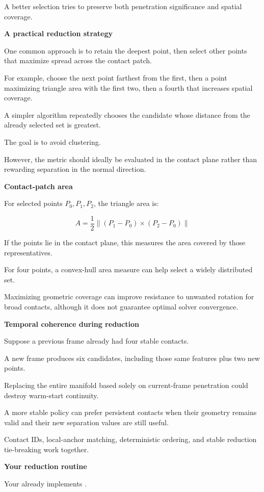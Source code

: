A better selection tries to preserve both penetration significance and spatial coverage.

\textbf{A practical reduction strategy}

One common approach is to retain the deepest point, then select other points that maximize spread across the contact patch.

For example, choose the next point farthest from the first, then a point maximizing triangle area with the first two, then a fourth that increases spatial coverage.

A simpler algorithm repeatedly chooses the candidate whose distance from the already selected set is greatest.

The goal is to avoid clustering.

However, the metric should ideally be evaluated in the contact plane rather than rewarding separation in the normal direction.

\textbf{Contact-patch area}

For selected points \(P_0,P_1,P_2\), the triangle area is:

\[
\boxed{ A=\frac12 \|(P_1-P_0)\times(P_2-P_0)\| }
\]

If the points lie in the contact plane, this measures the area covered by those representatives.

For four points, a convex-hull area measure can help select a widely distributed set.

Maximizing geometric coverage can improve resistance to unwanted rotation for broad contacts, although it does not guarantee optimal solver convergence.

\textbf{Temporal coherence during reduction}

Suppose a previous frame already had four stable contacts.

A new frame produces six candidates, including those same features plus two new points.

Replacing the entire manifold based solely on current-frame penetration could destroy warm-start continuity.

A more stable policy can prefer persistent contacts when their geometry remains valid and their new separation values are still useful.

Contact IDs, local-anchor matching, deterministic ordering, and stable reduction tie-breaking work together.

\textbf{Your reduction routine}

Your  already implements .

